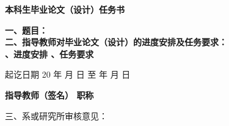 \cleardoublepage{}
{
  \begin{center}
    {\bfseries\fangsong{} 本科生毕业论文（设计）任务书}
  \end{center}
}
{
}

{
    \bfseries
    \noindent 一、题目：\\
    \noindent 二、指导教师对毕业论文（设计）的进度安排及任务要求：\\
    、进度安排
    \vskip 60mm
    、任务要求
    \vskip 40mm

    \noindent 起讫日期 20 \quad 年 \quad  月 \quad  日 \quad 至  \quad  年 \quad  月  \quad 日
    \begin{flushright}
        \bfseries {}
            指导教师（签名） \underline{} 职称 \underline{}
    \end{flushright}

    \noindent 三、系或研究所审核意见：\\

    \mbox{} \vfill
    \signature{负责人（签名）}
}
